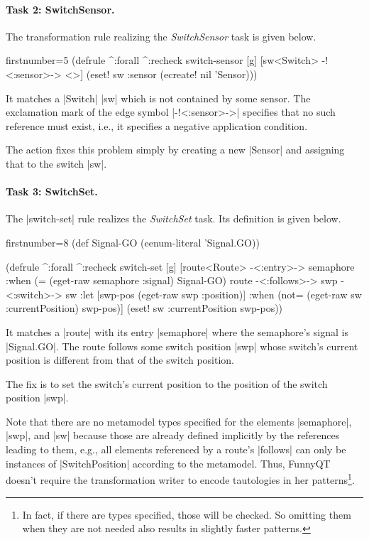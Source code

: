 \documentclass[submission]{eptcs}
\newcommand{\code}{\clojureinline}
\begin{document}
\paragraph{Task 2: SwitchSensor.}

The transformation rule realizing the \emph{SwitchSensor} task is given below.

\begin{clojurecode*}{firstnumber=5}
(defrule ^:forall ^:recheck switch-sensor [g]
  [sw<Switch> -!<:sensor>-> <>]
  (eset! sw :sensor (ecreate! nil 'Sensor)))
\end{clojurecode*}

It matches a \code|Switch| \code|sw| which is not contained by some sensor.
The exclamation mark of the edge symbol \code|-!<:sensor>->| specifies that no
such reference must exist, i.e., it specifies a negative application condition.

The action fixes this problem simply by creating a new \code|Sensor| and
assigning that to the switch \code|sw|.


\paragraph{Task 3: SwitchSet.}

The \code|switch-set| rule realizes the \emph{SwitchSet} task.  Its definition
is given below.

\begin{clojurecode*}{firstnumber=8}
(def Signal-GO (eenum-literal 'Signal.GO))

(defrule ^:forall ^:recheck switch-set [g]
  [route<Route> -<:entry>-> semaphore
   :when (= (eget-raw semaphore :signal) Signal-GO)
   route -<:follows>-> swp -<:switch>-> sw
   :let [swp-pos (eget-raw swp :position)]
   :when (not= (eget-raw sw :currentPosition) swp-pos)]
  (eset! sw :currentPosition swp-pos))
\end{clojurecode*}

It matches a \code|route| with its entry \code|semaphore| where the semaphore's
signal is \code|Signal.GO|.  The route follows some switch position \code|swp|
whose switch's current position is different from that of the switch position.

The fix is to set the switch's current position to the position of the switch
position \code|swp|.

Note that there are no metamodel types specified for the elements
\code|semaphore|, \code|swp|, and \code|sw| because those are already defined
implicitly by the references leading to them, e.g., all elements referenced by
a route's \code|follows| can only be instances of \code|SwitchPosition|
according to the metamodel.  Thus, FunnyQT doesn't require the transformation
writer to encode tautologies in her patterns\footnote{In fact, if there are
  types specified, those will be checked.  So omitting them when they are not
  needed also results in slightly faster patterns.}.
\end{document}
